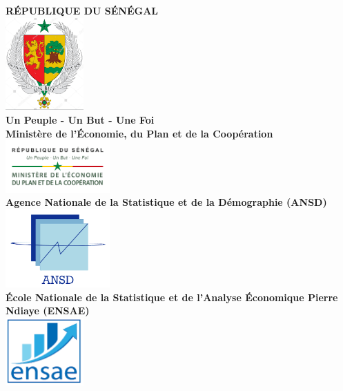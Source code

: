 \documentclass[
]{article}
\author{}
\date{\vspace{-2.5em}}
\begin{document}
\begin{titlepage}
    \begin{center}
        \textbf{\LARGE RÉPUBLIQUE DU SÉNÉGAL}\\[0.1cm]
        \includegraphics[width=3cm]{images/Logo1.jpg} \\[0.1cm]  %
        \textbf{\large Un Peuple - Un But - Une Foi}\\[0.2cm]
        
        \textbf{\LARGE Ministère de l'Économie, du Plan et de la Coopération}\\[0.1cm]
        \includegraphics[width=4cm]{images/Logo2.png} \\[0.1cm] 
        
        \textbf{\large Agence Nationale de la Statistique et de la Démographie (ANSD)}\\[0.2cm]
        
        \includegraphics[width=4cm]{images/Logo3.png} \\[0.1cm]  
        
        \textbf{\large École Nationale de la Statistique et de l'Analyse Économique Pierre Ndiaye (ENSAE)}\\[0.4cm]
        \includegraphics[width=3cm]{images/Logo4.png} \\[0.1cm]
        

\end{center}
\end{titlepage}
\end{document}
